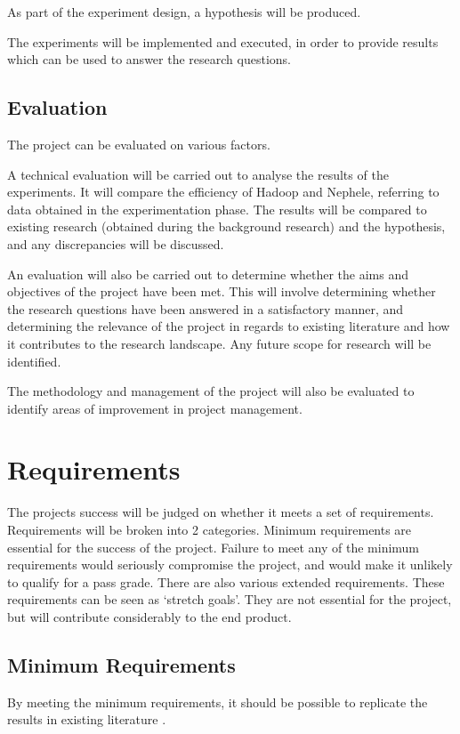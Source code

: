 As part of the experiment design, a hypothesis will be produced.

The experiments will be implemented and executed, in order to provide results which can be used to answer the research questions.

\subsection{Evaluation}
The project can be evaluated on various factors.

A technical evaluation will be carried out to analyse the results of the experiments. It will compare the efficiency of Hadoop and Nephele, referring to data obtained in the experimentation phase. The results will be compared to existing research (obtained during the background research) and the hypothesis, and any discrepancies will be discussed. 

An evaluation will also be carried out to determine whether the aims and objectives of the project have been met. This will involve determining whether the research questions have been answered in a satisfactory manner, and determining the relevance of the project in regards to existing literature and how it contributes to the research landscape. Any future scope for research will be identified. 

The methodology and management of the project will also be evaluated to identify areas of improvement in project management.

\section{Requirements}
The projects success will be judged on whether it meets a set of requirements. Requirements will be broken into 2 categories. Minimum requirements are essential for the success of the project. Failure to meet any of the minimum requirements would seriously compromise the project, and would make it unlikely to qualify for a pass grade. There are also various extended requirements. These requirements can be seen as `stretch goals'. They are not essential for the project, but will contribute considerably to the end product.

\subsection{Minimum Requirements}
By meeting the minimum requirements, it should be possible to replicate the results in existing literature \cite{warneke2011exploiting}. 

